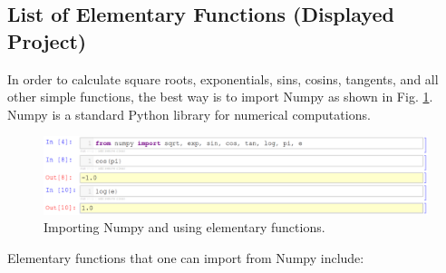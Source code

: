 \documentclass[article,A4,12pt]{llncs}
\begin{document}
\subsection{List of Elementary Functions  (Displayed Project)}

In order to calculate square roots, exponentials, sins, cosins, tangents, and all other 
simple functions, the best way is to import Numpy as shown in Fig. \ref{fig:fns}. Numpy 
is a standard Python library for numerical computations.

\begin{figure}[!ht]
\begin{center}
\includegraphics[width=\textwidth]{img/fns.png}
\end{center}
\vspace{-4mm}
\caption{Importing Numpy and using elementary functions.}
\label{fig:fns}
\end{figure}

\newpage
\noindent
Elementary functions that one can import from Numpy include:\\
\end{document}
